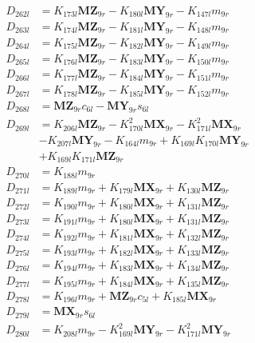 \begin{multicols}{2}
\begin{align}
D_{262l} &= K_{173l}\mathbf{MZ}_{9r} - K_{180l}\mathbf{MY}_{9r} - K_{147l}m_{9r} \nonumber \\
D_{263l} &= K_{174l}\mathbf{MZ}_{9r} - K_{181l}\mathbf{MY}_{9r} - K_{148l}m_{9r} \nonumber \\
D_{264l} &= K_{175l}\mathbf{MZ}_{9r} - K_{182l}\mathbf{MY}_{9r} - K_{149l}m_{9r} \nonumber \\
D_{265l} &= K_{176l}\mathbf{MZ}_{9r} - K_{183l}\mathbf{MY}_{9r} - K_{150l}m_{9r} \nonumber \\
D_{266l} &= K_{177l}\mathbf{MZ}_{9r} - K_{184l}\mathbf{MY}_{9r} - K_{151l}m_{9r} \nonumber \\
D_{267l} &= K_{178l}\mathbf{MZ}_{9r} - K_{185l}\mathbf{MY}_{9r} - K_{152l}m_{9r} \nonumber \\
D_{268l} &= \mathbf{MZ}_{9r}c_{6l} - \mathbf{MY}_{9r}s_{6l} \nonumber \\
D_{269l} &= K_{206l}\mathbf{MZ}_{9r} - K_{170l}^2\mathbf{MX}_{9r} - K_{171l}^2\mathbf{MX}_{9r}  \nonumber \\
&- K_{207l}\mathbf{MY}_{9r} - K_{164l}m_{9r} + K_{169l}K_{170l}\mathbf{MY}_{9r}  \nonumber \\
&+ K_{169l}K_{171l}\mathbf{MZ}_{9r} \nonumber \\
D_{270l} &= K_{188l}m_{9r} \nonumber \\
D_{271l} &= K_{189l}m_{9r} + K_{179l}\mathbf{MX}_{9r} + K_{130l}\mathbf{MZ}_{9r} \nonumber \\
D_{272l} &= K_{190l}m_{9r} + K_{180l}\mathbf{MX}_{9r} + K_{131l}\mathbf{MZ}_{9r} \nonumber \\
D_{273l} &= K_{191l}m_{9r} + K_{180l}\mathbf{MX}_{9r} + K_{131l}\mathbf{MZ}_{9r} \nonumber \\
D_{274l} &= K_{192l}m_{9r} + K_{181l}\mathbf{MX}_{9r} + K_{132l}\mathbf{MZ}_{9r} \nonumber \\
D_{275l} &= K_{193l}m_{9r} + K_{182l}\mathbf{MX}_{9r} + K_{133l}\mathbf{MZ}_{9r} \nonumber \\
D_{276l} &= K_{194l}m_{9r} + K_{183l}\mathbf{MX}_{9r} + K_{134l}\mathbf{MZ}_{9r} \nonumber \\
D_{277l} &= K_{195l}m_{9r} + K_{184l}\mathbf{MX}_{9r} + K_{135l}\mathbf{MZ}_{9r} \nonumber \\
D_{278l} &= K_{196l}m_{9r} + \mathbf{MZ}_{9r}c_{5l} + K_{185l}\mathbf{MX}_{9r} \nonumber \\
D_{279l} &= \mathbf{MX}_{9r}s_{6l} \nonumber \\
D_{280l} &= K_{208l}m_{9r} - K_{169l}^2\mathbf{MY}_{9r} - K_{171l}^2\mathbf{MY}_{9r}  \nonumber \\

\end{align}
\end{multicols}
